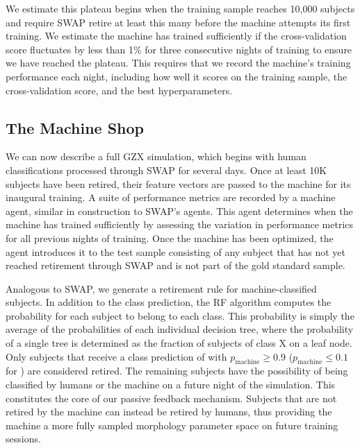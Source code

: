 We estimate this plateau begins when the training 
sample reaches 10,000 subjects and require SWAP retire at least this many 
 before the machine attempts its first training.  We estimate the machine 
has trained sufficiently if the cross-validation score fluctuates by less than 1\% 
for three consecutive nights of training to ensure we have reached the plateau.  
This requires that we record the machine's training performance each night, 
including how well it scores on the training sample, the 
cross-validation score, and the best hyperparameters. 



\subsection{The Machine Shop}\label{sec: machine shop}
We can now describe a full GZX simulation, which begins with human classifications 
processed through SWAP for several days.   
Once at least 10K subjects have been retired, their feature vectors are passed to 
the machine for its inaugural training. 
A suite of performance metrics are recorded by a machine agent, similar
in construction to SWAP's agents. This agent determines 
when the machine has trained sufficiently by assessing the variation
in performance metrics for all previous nights of training. 
Once the machine has been optimized, the agent introduces it to the test sample
consisting of any subject that has not yet reached retirement through SWAP 
and is not part of the gold standard sample.  

Analogous to SWAP, we generate a retirement rule for machine-classified subjects. 
In addition to the class prediction, the RF algorithm computes the probability for
each subject to belong to each class.  This probability is simply the average of
 the probabilities of each individual decision tree, where the probability of a 
single tree is determined as the fraction of subjects of class X on a leaf node.  
Only subjects that receive a class prediction of \feat with 
$p_{\mathrm{machine}} \ge 0.9$ ($p_{\mathrm{machine}} \le 0.1$ for \notfeat)
are considered retired. 
The remaining subjects have the possibility of being classified by humans 
or the machine on a future night of the simulation. 
This constitutes the core of our passive feedback mechanism. Subjects that are
not retired by the machine can instead be retired by humans, thus providing 
the machine a more fully sampled morphology parameter space on future 
training sessions. 

